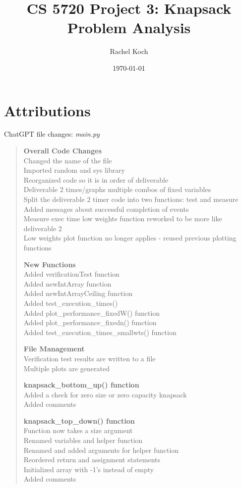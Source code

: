 \documentclass{article}
\title{CS 5720 Project 3: Knapsack Problem Analysis}
\author{Rachel Koch}
\date{\today}
\begin{document}
\maketitle

\section{Attributions}

ChatGPT file changes: \textit{main.py}

\begin{quote}
\textbf{Overall Code Changes} \\
Changed the name of the file\\
Imported random and sys library \\
Reorganized code so it is in order of deliverable \\
Deliverable 2 times/graphs multiple combos of fixed variables \\
Split the deliverable 2 timer code into two functions: test and measure \\
Added messages about successful completion of events \\
Measure exec time low weights function reworked to be more like deliverable 2 \\
Low weights plot function no longer applies - reused previous plotting functions

\textbf{New Functions} \\
Added verificationTest function \\
Added newIntArray function \\
Added newIntArrayCeiling function \\
Added test\_execution\_times() \\
Added plot\_performance\_fixedW() function \\
Added plot\_performance\_fixedn() function \\
Added test\_execution\_times\_smallwts() function

\textbf{File Management} \\
Verification test results are written to a file \\
Multiple plots are generated

\textbf{knapsack\_bottom\_up() function} \\
Added a check for zero size or zero capacity knapsack \\
Added comments

\textbf{knapsack\_top\_down() function} \\
Function now takes a size argument \\
Renamed variables and helper function \\
Renamed and added arguments for helper function \\
Reordered return and assignment statements \\
Initialized array with -1's instead of empty \\
Added comments


\end{quote}
\end{document}
